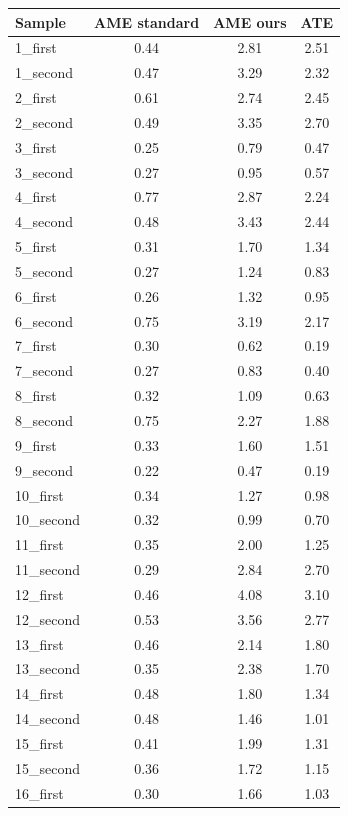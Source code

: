 \documentclass{mipt-thesis-ms}
\begin{document}
	\begin{table}
		\centering
		\begin{tabular}{l|c|c|c}
			\textbf{Sample} & \textbf{AME standard} & \textbf{AME ours} & \textbf{ATE} \\
			\hline
			1\_first & 0.44 & 2.81 & 2.51 \\
			1\_second & 0.47 & 3.29 & 2.32 \\
			2\_first & 0.61 & 2.74 & 2.45 \\
			2\_second & 0.49 & 3.35 & 2.70 \\
			3\_first & 0.25 & 0.79 & 0.47 \\
			3\_second & 0.27 & 0.95 & 0.57 \\
			4\_first & 0.77 & 2.87 & 2.24 \\
			4\_second & 0.48 & 3.43 & 2.44 \\
			5\_first & 0.31 & 1.70 & 1.34 \\
			5\_second & 0.27 & 1.24 & 0.83 \\
			6\_first & 0.26 & 1.32 & 0.95 \\
			6\_second & 0.75 & 3.19 & 2.17 \\
			7\_first & 0.30 & 0.62 & 0.19 \\
			7\_second & 0.27 & 0.83 & 0.40 \\
			8\_first & 0.32 & 1.09 & 0.63 \\
			8\_second & 0.75 & 2.27 & 1.88 \\
			9\_first & 0.33 & 1.60 & 1.51 \\
			9\_second & 0.22 & 0.47 & 0.19 \\
			10\_first & 0.34 & 1.27 & 0.98 \\
			10\_second & 0.32 & 0.99 & 0.70 \\
			11\_first & 0.35 & 2.00 & 1.25 \\
			11\_second & 0.29 & 2.84 & 2.70 \\
			12\_first & 0.46 & 4.08 & 3.10 \\
			12\_second & 0.53 & 3.56 & 2.77 \\
			13\_first & 0.46 & 2.14 & 1.80 \\
			13\_second & 0.35 & 2.38 & 1.70 \\
			14\_first & 0.48 & 1.80 & 1.34 \\
			14\_second & 0.48 & 1.46 & 1.01 \\
			15\_first & 0.41 & 1.99 & 1.31 \\
			15\_second & 0.36 & 1.72 & 1.15 \\
			16\_first & 0.30 & 1.66 & 1.03 \\

\end{tabular}
\end{table}
\end{document}
